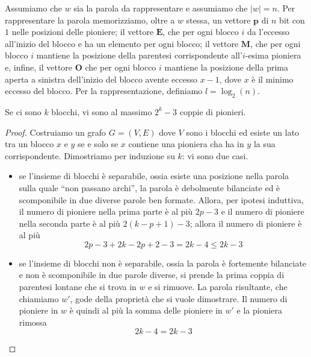 Assumiamo che $w$ sia la parola da rappresentare e assumiamo che $|w| = n$.
Per rappresentare la parola memorizziamo, oltre a $w$ stessa, un vettore $\mathbf{p}$ di $n$ bit
con $1$ nelle posizioni delle pioniere; il vettore $\mathbf{E}$, che per ogni blocco $i$
da l'eccesso all'inizio del blocco e ha un elemento per ogni blocco; il vettore $\mathbf{M}$, che per ogni
blocco $i$ mantiene la posizione della parentesi corrispondente all'$i$-esima pioniera e, infine, il vettore
$\mathbf{O}$ che per ogni blocco $i$ mantiene la posizione della prima aperta a sinistra dell'inizio del blocco
avente eccesso $x-1$, dove $x$ è il minimo eccesso del blocco. Per la rappresentazione, definiamo $l = \log_2(n)$.
\begin{theorem}
	Se ci sono $k$ blocchi, vi sono al massimo $2^k - 3$ coppie di pionieri.
\end{theorem}
\begin{proof}
	Costruiamo un grafo $G = (V, E)$ dove $V$ sono i blocchi ed esiste un lato tra un blocco $x$ e $y$ se
	e solo se $x$ contiene una pioniera cha ha in $y$ la sua corrispondente.
	Dimostriamo per induzione su $k$: vi sono due casi.
	\begin{itemize}
		\item se l'insieme di blocchi è separabile, ossia esiste una posizione nella parola sulla quale
		      ``non passano archi'', la parola è debolmente bilanciate ed è scomponibile in due diverse
		      parole ben formate. Allora, per ipotesi induttiva, il numero di pioniere nella prima
		      parte è al più $2p - 3$ e il numero di pioniere nella seconda parte è al più $2(k - p + 1) - 3$;
		      allora il numero di pioniere è al più
		      $$
			      2p - 3 + 2 k - 2p + 2 - 3 = 2k - 4 \leq 2k - 3
		      $$
		\item se l'insieme di blocchi non è separabile, ossia la parola è fortemente
		      bilanciate e non è scomponibile in due parole diverse, si prende la
		      prima coppia di parentesi lontane che si trova in $w$ e si rimuove. La parola risultante,
		      che chiamiamo $w'$, gode della proprietà che si vuole dimostrare. Il numero
		      di pioniere in $w$ è quindi al più la somma delle pioniere in $w'$ e la pioniera rimossa
		      $$
			      2k - 4  = 2k - 3
		      $$

	\end{itemize}
\end{proof}

